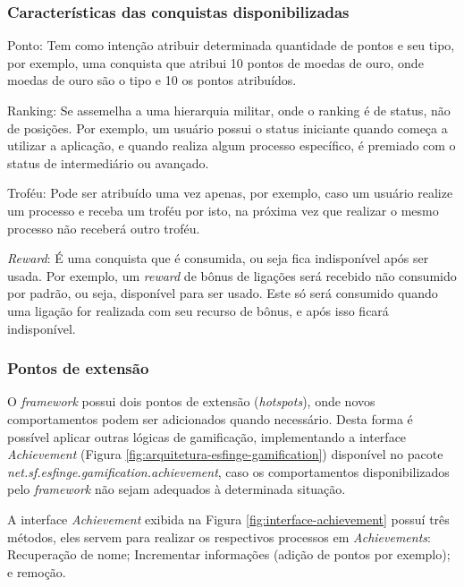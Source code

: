 \subsubsection{Características das conquistas disponibilizadas}

\par Ponto: Tem como intenção atribuir determinada quantidade de pontos e seu tipo, por exemplo, uma conquista que atribui 10 pontos de moedas de ouro, onde moedas de ouro são o tipo e 10 os pontos atribuídos. 
\par Ranking: Se assemelha a uma hierarquia militar, onde o ranking é de status, não de posições. Por exemplo, um usuário possui o status iniciante quando começa a utilizar a aplicação, e quando realiza algum processo específico, é premiado com o status de intermediário ou avançado.

\par Troféu: Pode ser atribuído uma vez apenas, por exemplo, caso um usuário realize um processo e receba um troféu por isto, na próxima vez que realizar o mesmo processo não receberá outro troféu.

\par \textit{Reward}: É uma conquista que é consumida, ou seja fica indisponível após ser usada. Por exemplo, um \textit{reward} de bônus de ligações será recebido não consumido por padrão, ou seja, disponível para ser usado. Este só será consumido quando uma ligação for realizada com seu recurso de bônus, e após isso ficará indisponível.

\subsubsection{Pontos de extensão}

O \textit{framework} possui dois pontos de extensão (\textit{hotspots}), onde novos comportamentos podem ser adicionados quando necessário. Desta forma é possível aplicar outras lógicas de gamificação, implementando a interface \textit{Achievement} (Figura \ref{fig:arquitetura-esfinge-gamification}) disponível no pacote \textit{net.sf.esfinge.gamification.achievement}, caso os comportamentos disponibilizados pelo \textit{framework} não sejam adequados \`a determinada situação. 
\par A interface \textit{Achievement} exibida na Figura \ref{fig:interface-achievement} possuí três métodos, eles servem para realizar os respectivos processos em \textit{Achievements}: Recuperação de nome; Incrementar informações (adição de pontos por exemplo); e remoção.


